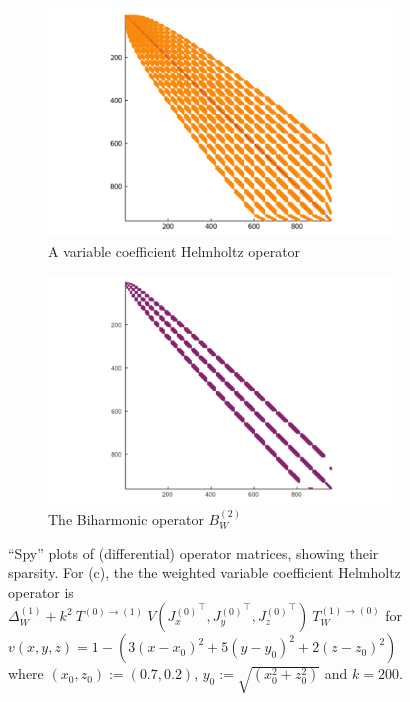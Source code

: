 \documentclass[11pt, oneside]{article}   	%
\begin{document}
\begin{figure}[t]
	\medskip
	\begin{subfigure}{0.45\textwidth}
		\includegraphics[scale=0.3]{sparsity-of-helmholtz}
		\centering
		\caption{A variable coefficient Helmholtz operator}
	\end{subfigure}\hfil %
	\begin{subfigure}{0.45\textwidth}
		\includegraphics[scale=0.3]{sparsity-of-biharmonic}
		\centering
		\caption{The Biharmonic operator $B_W^{(2)}$}
	\end{subfigure}\hfil %
	\caption{\enquote{Spy} plots of (differential) operator matrices, showing their sparsity. For (c), the the weighted variable coefficient Helmholtz operator is $\Delta^{(1)}_W + k^2 \: T^{(0)\to(1)} \: V({J_x^{(0)}}^\top, {J_y^{(0)}}^\top, {J_z^{(0)}}^\top) \: T_W^{(1)\to(0)}$ for $v(x,y,z) = 1 - (3(x-x_0)^2 + 5(y-y_0)^2 + 2(z-z_0)^2)$ where $(x_0, z_0) := (0.7, 0.2)$, $y_0 := \sqrt{(x_0^2 + z_0^2)}$ and $k = 200$.}
	\label{fig:sparsity}
\end{figure}
\end{document}
